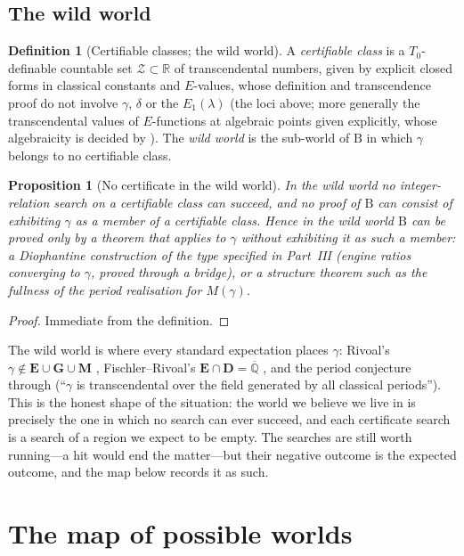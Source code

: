 \documentclass[11pt,a4paper]{article}
\newcommand{\R}{\mathbb R}
\newcommand{\Qbar}{\overline{\mathbb Q}}
\newcommand{\EE}{\mathbf E}
\newcommand{\GG}{\mathbf G}
\newcommand{\DD}{\mathbf D}
\newcommand{\MM}{\mathbf M}
\newcommand{\Tz}{T_0}
\newtheorem{proposition}[theorem]{Proposition}
\theoremstyle{definition}
\newtheorem{definition}[theorem]{Definition}
\theoremstyle{remark}
\numberwithin{equation}{section}
\begin{document}
\subsection{The wild world}

\begin{definition}[Certifiable classes; the wild world]\label{IV:def:wild}
A \emph{certifiable class} is a $\Tz$-definable countable set $\mathcal Z\subset\R$ of
transcendental numbers, given by explicit closed forms in classical constants and
$E$-values, whose definition and transcendence proof do not involve $\gamma$, $\delta$ or
the $E_1(\lambda)$ (the loci above; more generally the transcendental values of
$E$-functions at algebraic points given explicitly, whose algebraicity is decided by
\cite{AR}). The \emph{wild world} is the sub-world of $\mathrm B$ in which $\gamma$
belongs to no certifiable class.
\end{definition}

\begin{proposition}[No certificate in the wild world]\label{IV:prop:wild}
In the wild world no integer-relation search on a certifiable class can succeed, and no
proof of $\mathrm B$ can consist of exhibiting $\gamma$ as a member of a certifiable
class. Hence in the wild world $\mathrm B$ can be proved only by a theorem that applies to
$\gamma$ without exhibiting it as such a member: a Diophantine construction of the type
specified in Part~III (engine ratios converging to $\gamma$, proved through a bridge), or a
structure theorem such as the fullness of the period realisation for $M(\gamma)$.
\end{proposition}
\begin{proof}
Immediate from the definition.
\end{proof}

The wild world is where every standard expectation places $\gamma$: Rivoal's
$\gamma\notin\EE\cup\GG\cup\MM$ \cite{Rivoal2017}, Fischler--Rivoal's $\EE\cap\DD=\Qbar$
\cite{FRmixed}, and the period conjecture through \cite{FJtalk} (``$\gamma$ is
transcendental over the field generated by all classical periods''). This is the honest shape of the situation: the
world we believe we live in is precisely the one in which no search can ever succeed, and
each certificate search is a search of a region we expect to be empty. The searches are
still worth running---a hit would end the matter---but their negative outcome is the
expected outcome, and the map below records it as such.

\section{The map of possible worlds}\label{IV:sec:map}
\end{document}
